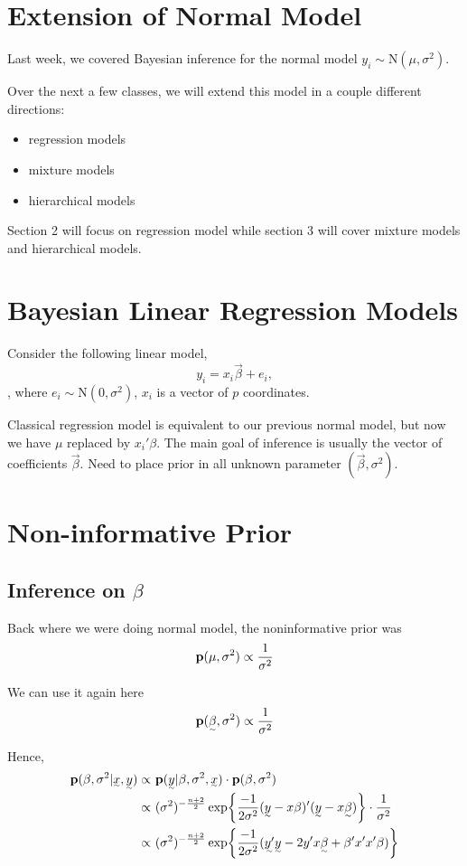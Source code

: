 \section{Extension of Normal Model}
Last week, we covered Bayesian inference for the normal model $y_i \sim \text{N}(\mu, \sigma^2)$.

Over the next a few classes, we will extend this model in a couple different directions:
\begin{itemize}
    \item regression models 
    \item mixture models
    \item hierarchical models
\end{itemize}

Section 2 will focus on regression model while section 3 will cover mixture models and hierarchical models.

\section{Bayesian Linear Regression Models}

Consider the following linear model, 
\[
y_i = x_i \Vec{\beta} + e_i,
\]
, where $e_i \sim \text{N}(0, \sigma^2)$, $x_i$ is a vector of $p$ coordinates.

Classical regression model is equivalent to our previous normal model, but now we have $\mu$ replaced by $x_i'\beta$. The main goal of inference is usually the vector of coefficients $\Vec{\beta}$. Need to place prior in all unknown parameter $(\Vec{\beta}, \sigma^2)$.

\section{Non-informative Prior}
\subsection{Inference on $\beta$}
Back where we were doing normal model, the noninformative prior was 
\[
{\mathbf p}(\mu, \sigma^2) \propto \frac{1}{\sigma^2}
\]

We can use it again here
\[
\p(\Vec{\beta}, \sigma^2) \propto \frac{1}{\sigma^2}
\]

Hence,
\begin{align*}
    \p(\beta, \sigma^2| \vec{x}, \Vec{y}) 
    \propto& ~\p(\vec{y}| \beta, \sigma^2,\vec{x}) \cdot \p(\beta, \sigma^2)\\
    \propto& ~(\sigma^2)^{-\frac{n+2}{2}} \exp{\frac{-1}{2\sigma^2} (\vec{y} - x\beta)'(\vec{y} - x\vec{\beta})} \cdot \frac{1}{\sigma^2}\\
    \propto& ~(\sigma^2)^{-\frac{n+2}{2}} \exp{\frac{-1}{2\sigma^2}(\vec{y'}\vec{y} - 2y'x\vec{\beta} + \beta' x' x' \beta)}
\end{align*}

